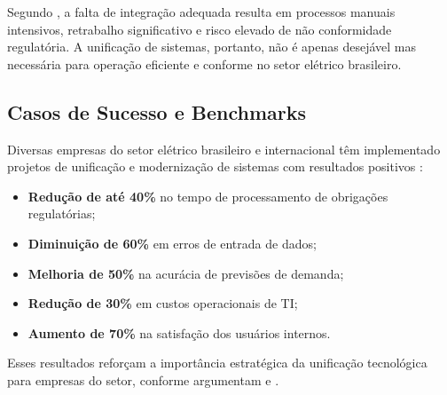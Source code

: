 Segundo \cite{tolmasquim2016}, a falta de integração adequada resulta em processos manuais intensivos, retrabalho significativo e risco elevado de não conformidade regulatória. A unificação de sistemas, portanto, não é apenas desejável mas necessária para operação eficiente e conforme no setor elétrico brasileiro.

\subsection{Casos de Sucesso e Benchmarks}

Diversas empresas do setor elétrico brasileiro e internacional têm implementado projetos de unificação e modernização de sistemas com resultados positivos \cite{epe2020}:

\begin{itemize}
    \item \textbf{Redução de até 40\%} no tempo de processamento de obrigações regulatórias;
    \item \textbf{Diminuição de 60\%} em erros de entrada de dados;
    \item \textbf{Melhoria de 50\%} na acurácia de previsões de demanda;
    \item \textbf{Redução de 30\%} em custos operacionais de TI;
    \item \textbf{Aumento de 70\%} na satisfação dos usuários internos.
\end{itemize}

Esses resultados reforçam a importância estratégica da unificação tecnológica para empresas do setor, conforme argumentam \cite{laudon2020} e \cite{davenport2018}.